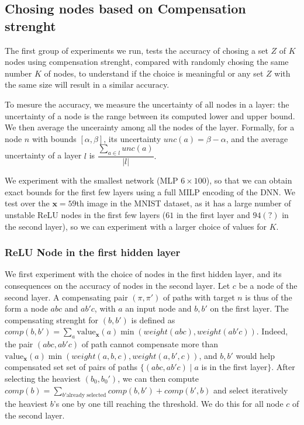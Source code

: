 \documentclass{llncs}
\newcommand{\vx}{\boldsymbol{x}}
\newcommand{\val}{{\textrm{value}}}
\begin{document}
\subsection{Chosing nodes based on Compensation strenght}

The first group of experiments we run, tests the accuracy of chosing a set $Z$ of $K$ nodes using compensation strenght, compared with randomly chosing the same number $K$ of nodes, to understand if the choice is meaningful or any set $Z$ with the same size will result in a similar accuracy.

To mesure the accuracy, we measure the uncertainty of all nodes in a layer:
the uncertainty of a node is the range between its computed lower and upper bound. 
We then average the uncerainty among all the nodes of the layer.
Formally, for a node $n$ with bounds $[\alpha,\beta]$, its uncertainty $unc(a) = \beta - \alpha$, and the average uncertainty of a layer $l$ is $\dfrac{\sum_{a\in l} unc(a)}{|l|}.$

We experiment with the smallest network (MLP $6\times 100$), so that we can obtain exact bounds for the first few layers using a full MILP encoding of the DNN. We test over the $\vx=59$th image in the MNIST dataset, as it has a large number of unstable ReLU nodes in the first few layers ($61$ in the first layer and $94(?)$ in the second layer), so we can experiment with a larger choice of values for $K$.

\subsubsection*{ReLU Node in the first hidden layer}

We first experiment with the choice of nodes in the first hidden layer, and its consequences on the accuracy of nodes in the second layer.  Let $c$ be a node of the second layer.
A compensating pair $(\pi,\pi')$ of paths with target $n$ is thus of the form a node $a b c$ and $a b' c$, with $a$ an input node and $b,b'$ on the first layer. The compensating strenght for $(b,b')$ is defined as 
$comp(b,b')=\sum_a \val_{\vx}(a) \min(weight(abc),weight(ab'c))$. Indeed, 
the pair $(a b c,a b' c)$ of path cannot compensate more than $\val_{\vx}(a) \min(weight(a,b,c),weight(a,b',c))$, and $b,b'$ would help compensated set set of pairs of paths $\{(a b c,a b' c) \mid a$ is in the first layer$\}$. After selecting the heaviest $(b_0,b_0')$, we can then compute $comp(b)= \sum_{b' \text{already selected}} comp(b,b')+comp(b',b)$ and select iteratively the heaviest $b$'s one by one till reaching the threshold. We do this for all node $c$ of the second layer.
\end{document}

